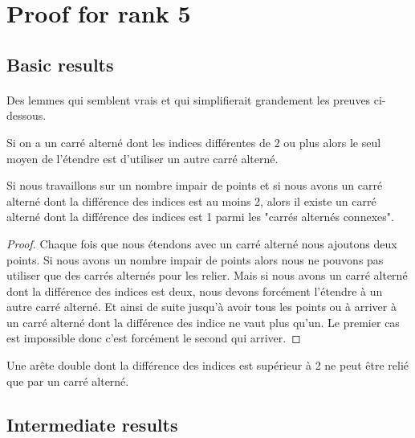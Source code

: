 \section{Proof for rank 5}


\subsection{Basic results}

\paragraph{}
Des lemmes qui semblent vrais et qui simplifierait grandement les preuves ci-dessous.

\begin{lemma}
  Si on a un carré alterné dont les indices différentes de 2 ou plus alors le seul moyen de l'étendre est d'utiliser un autre carré alterné.
\end{lemma}

\begin{corollary}
  Si nous travaillons sur un nombre impair de points et si nous avons un carré alterné dont la différence des indices est au moins 2, alors il existe un carré alterné dont la différence des indices est 1 parmi les "carrés alternés connexes".
\end{corollary}

\begin{proof}
  Chaque fois que nous étendons avec un carré alterné nous ajoutons deux points. Si nous avons un nombre impair de points alors nous ne pouvons pas utiliser que des carrés alternés pour les relier. Mais si nous avons un carré alterné dont la différence des indices est deux, nous devons forcément l'étendre à un autre carré alterné. Et ainsi de suite jusqu'à avoir tous les points ou à arriver à un carré alterné dont la différence des indice ne vaut plus qu'un. Le premier cas est impossible donc c'est forcément le second qui arriver.
\end{proof}

\begin{lemma}
  Une arête double dont la différence des indices est supérieur à 2 ne peut être relié que par un carré alterné.
\end{lemma}

\subsection{Intermediate results}

